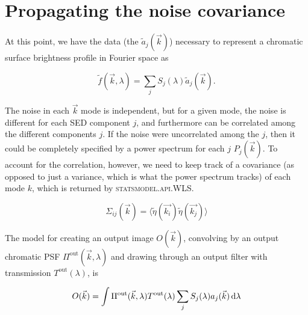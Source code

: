 \documentclass{article}
\begin{document}


\section{Propagating the noise covariance}

At this point, we have the data (the $\tilde{a}_j(\vec{k})$) necessary to represent a chromatic
surface brightness profile in Fourier space as

\begin{equation}
  \tilde{f}(\vec{k}, \lambda) = \sum_j S_j(\lambda) \tilde{a}_j(\vec{k}).
\end{equation}

The noise in each $\vec{k}$ mode is independent, but for a given mode, the noise is different for
each SED component $j$, and furthermore can be correlated among the different components $j$.  If
the noise were uncorrelated among the $j$, then it could be completely specified by a power spectrum
for each $j$ $P_j(\vec{k})$.  To account for the correlation, however, we need to keep track of a
covariance (as opposed to just a variance, which is what the power spectrum tracks) of each mode
$k$, which is returned by \textsc{statsmodel.api.WLS}.

\begin{equation}
  \Sigma_{ij}(\vec{k}) = \langle\tilde\eta(\vec{k_i})\tilde\eta(\vec{k_j})\rangle
\end{equation}

The model for creating an output image $O(\vec{k})$, convolving by an output chromatic PSF
$\Pi^\mathrm{out}(\vec{k}, \lambda)$ and drawing through an output filter with transmission
$T^\mathrm{out}(\lambda)$, is

\begin{equation}
  O(\vec{k}) = \int \Pi^\mathrm{out}(\vec{k}, \lambda) T^\mathrm{out}(\lambda) \sum_j S_j(\lambda) a_j(\vec{k}) \dif{\lambda}
\end{equation}
\end{document}
